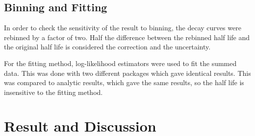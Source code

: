 \documentclass[MaxHughesThesis.tex]{subfiles}
\begin{document}
\subsection{Binning and Fitting}
In order to check the sensitivity of the result to binning, the decay curves were rebinned by a factor of two.
Half the difference between the rebinned half life and the original half life is considered the correction and the uncertainty.

For the fitting method, log-likelihood estimators were used to fit the summed data.
This was done with two different packages which gave identical results. 
This was compared to analytic results, which gave the same results, so the half life is insensitive to the fitting method.

\section{Result and Discussion}
\label{sec:result}
\end{document}
